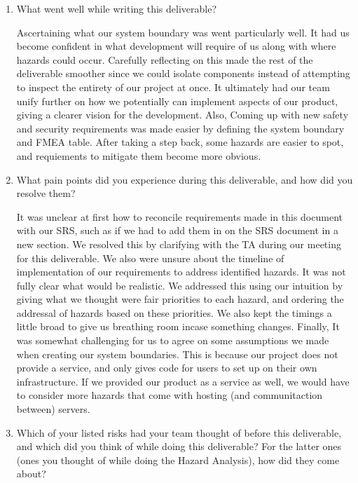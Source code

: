 \documentclass{article}
\begin{document}



\begin{enumerate}
    \item What went well while writing this deliverable? 

    Ascertaining what our system boundary was went particularly well. It had 
    us become confident in what development will require of us along with 
    where hazards could occur. Carefully reflecting on this made the rest 
    of the deliverable smoother since we could isolate components instead of 
    attempting to inspect the entirety of our project at once. It ultimately 
    had our team unify further on how we potentially can implement aspects of
    our product, giving a clearer vision for the development.
    Also, Coming up with new safety and security requirements was made easier by
    defining the system boundary and FMEA table. After taking a step back, some
    hazards are easier to spot, and requiements to mitigate them become more obvious.

    \item What pain points did you experience during this deliverable, and how
    did you resolve them?

    It was unclear at first how to reconcile requirements made in this document
    with our SRS, such as if we had to add them in on the SRS document in a
    new section. We resolved this by clarifying with the TA during our meeting
    for this deliverable. We also were unsure about the timeline of
    implementation of our requirements to address identified hazards. It was
    not fully clear what would be realistic. We addressed this using our 
    intuition by giving what we thought were fair priorities to each
    hazard, and ordering the addressal of hazards based on these priorities.
    We also kept the timings a little broad to give us breathing room incase 
    something changes.
    Finally, It was somewhat challenging for us to agree on some assumptions we made
    when creating our system boundaries. This is because our project does not provide
    a service, and only gives code for users to set up on their own infrastructure.
    If we provided our product as a service as well, we would have to consider more
    hazards that come with hosting (and communitaction between) servers.

    \item Which of your listed risks had your team thought of before this
    deliverable, and which did you think of while doing this deliverable? For
    the latter ones (ones you thought of while doing the Hazard Analysis), how
    did they come about?
    

\end{enumerate}
\end{document}
